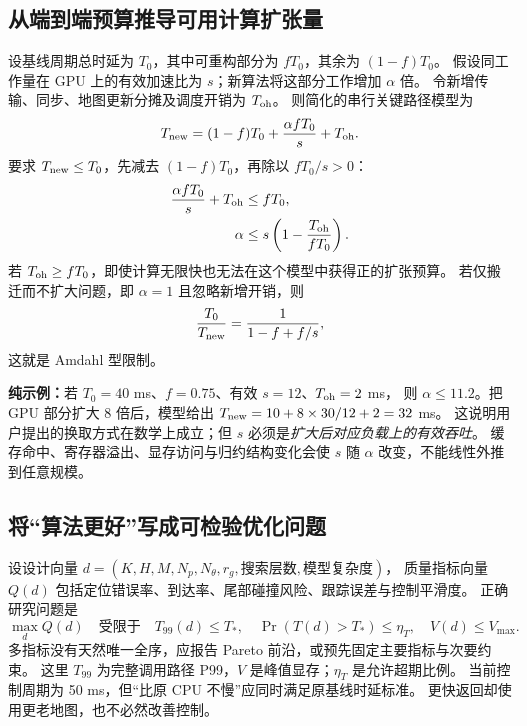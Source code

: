 \subsection{从端到端预算推导可用计算扩张量}
设基线周期总时延为 $T_0$，其中可重构部分为 $fT_0$，其余为 $(1-f)T_0$。
假设同工作量在 GPU 上的有效加速比为 $s$；新算法将这部分工作增加 $\alpha$ 倍。
令新增传输、同步、地图更新分摊及调度开销为 $T_{\rm oh}$。
则简化的串行关键路径模型为
\begin{equation}
T_{\rm new}=(1-f)T_0+\frac{\alpha fT_0}{s}+T_{\rm oh}.
\label{eq:budget}
\end{equation}
要求 $T_{\rm new}\le T_0$，先减去 $(1-f)T_0$，再除以 $fT_0/s>0$：
\begin{align}
\frac{\alpha fT_0}{s}+T_{\rm oh}&\le fT_0,\\
\alpha&\le s\left(1-\frac{T_{\rm oh}}{fT_0}\right).
\label{eq:expansion}
\end{align}
若 $T_{\rm oh}\ge fT_0$，即使计算无限快也无法在这个模型中获得正的扩张预算。
若仅搬迁而不扩大问题，即 $\alpha=1$ 且忽略新增开销，则
\[
\frac{T_0}{T_{\rm new}}=\frac1{1-f+f/s},
\]
这就是 Amdahl 型限制。

\textbf{纯示例：}若 $T_0=40$ ms、$f=0.75$、有效 $s=12$、$T_{\rm oh}=2$ ms，
则 $\alpha\le11.2$。把 GPU 部分扩大 $8$ 倍后，模型给出
$T_{\rm new}=10+8\times30/12+2=32$ ms。
这说明用户提出的换取方式在数学上成立；但 $s$ 必须是\emph{扩大后对应负载上的有效吞吐}。
缓存命中、寄存器溢出、显存访问与归约结构变化会使 $s$ 随 $\alpha$ 改变，不能线性外推到任意规模。

\subsection{将“算法更好”写成可检验优化问题}
设设计向量
$d=(K,H,M,N_p,N_\theta,r_g,\text{搜索层数},\text{模型复杂度})$，
质量指标向量 $Q(d)$ 包括定位错误率、到达率、尾部碰撞风险、跟踪误差与控制平滑度。
正确研究问题是
\begin{equation}
\max_d Q(d)\quad\text{受限于}\quad
T_{99}(d)\le T_*,\quad
\Pr(T(d)>T_*)\le\eta_T,\quad
V(d)\le V_{\max}.
\label{eq:pareto}
\end{equation}
多指标没有天然唯一全序，应报告 Pareto 前沿，或预先固定主要指标与次要约束。
这里 $T_{99}$ 为完整调用路径 P99，$V$ 是峰值显存；$\eta_T$ 是允许超期比例。
当前控制周期为 50 ms，但“比原 CPU 不慢”应同时满足原基线时延标准。
更快返回却使用更老地图，也不必然改善控制。

